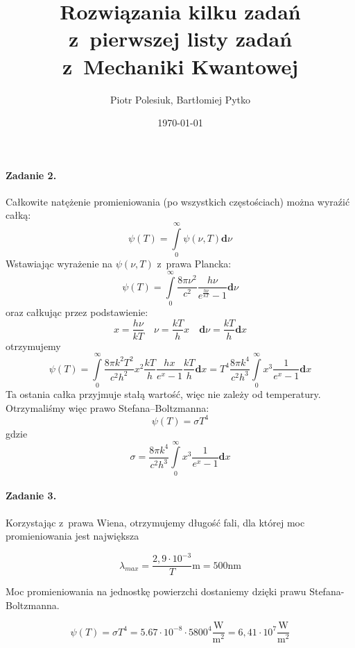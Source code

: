 \documentclass{article}
\title{Rozwiązania kilku zadań z~pierwszej listy zadań z~Mechaniki Kwantowej}
\author{Piotr Polesiuk, Bartłomiej Pytko}
\date{\today}
\newcommand*{\intd}{\mathrm{\textbf{d}}}
\newcommand*{\ut}[1]{\mathrm{#1}}
\begin{document}
\maketitle

\paragraph{Zadanie 2.}

Całkowite natężenie promieniowania (po wszystkich częstościach) można wyraźić 
całką:
\[
\psi(T) = \int\limits_0^\infty \psi(\nu, T) \intd\nu
\]
Wstawiając wyrażenie na $\psi(\nu, T)$ z~prawa Plancka:
\[
\psi(T) = \int\limits_0^\infty \frac{8\pi\nu^2}{c^2} 
	\frac{h\nu}{e^\frac{h\nu}{kT} - 1} \intd\nu
\]
oraz całkując przez podstawienie:
\[
x = \frac{h\nu}{kT}
\quad
\nu = \frac{kT}{h}x
\quad
\intd\nu = \frac{kT}{h}\intd x
\]
otrzymujemy
\[
\psi(T) 
= \int\limits_0^\infty \frac{8\pi k^2 T^2}{c^2 h^2}x^2
	\frac{kT}{h}\frac{hx}{e^x - 1}\frac{kT}{h}\intd x
= T^4\frac{8\pi k^4}{c^2 h^3}
	\int\limits_0^\infty x^3\frac{1}{e^x - 1}\intd x
\]
Ta ostania całka przyjmuje stałą wartość, więc nie zależy od temperatury.
Otrzymaliśmy więc prawo Stefana--Boltzmanna:
\[
\psi(T) = \sigma T^4
\]
gdzie
\[
\sigma = \frac{8\pi k^4}{c^2 h^3}
	\int\limits_0^\infty x^3\frac{1}{e^x - 1}\intd x
\]
\paragraph{Zadanie 3.}

Korzystając z~prawa Wiena,
otrzymujemy długość fali, dla której moc promieniowania jest największa

\[
\lambda_{max} = \frac{2,9 \cdot 10^{-3}}{T} \ut{m} = 500 \ut{nm}
\]

Moc promieniowania na jednostkę powierzchi dostaniemy dzięki prawu 
Stefana-Boltzmanna.

\[
\psi(T) =\sigma T^4 = 5.67 \cdot 10^{-8} \cdot 5800^4 \frac{\ut{W}}{\ut{m^2}}
= 6,41 \cdot 10^7 \frac{\ut{W}}{\ut{m^2}}
\]
\end{document}
